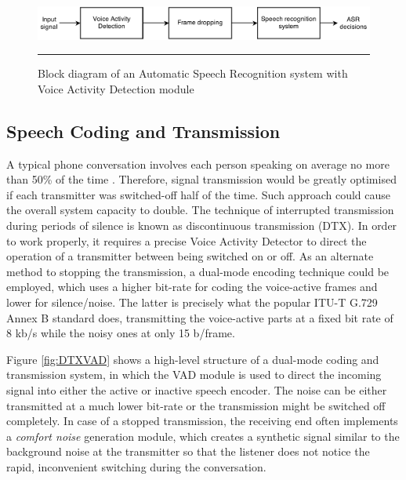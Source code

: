 \begin{figure}[htbp]
	\centering
		\includegraphics[width=1\columnwidth]{Figures/ASRVAD.png}
		\rule{37em}{0.5pt}
	\caption[Automatic Speech Recognition system with Voice Activity Detection module]{Block diagram of an Automatic Speech Recognition system with Voice Activity Detection module \cite{RamirezGorriz}}
	\label{fig:ASRVAD}
\end{figure}

\subsection{Speech Coding and Transmission}

A typical phone conversation involves each person speaking on average no more than 50\% of the time \citep{GSMControl}. Therefore, signal transmission would be greatly optimised if each transmitter was switched-off half of the time. Such approach could cause the overall system capacity to double. The technique of interrupted transmission during periods of silence is known as discontinuous transmission (DTX). In order to work properly, it requires a precise Voice Activity Detector to direct the operation of a transmitter between being switched on or off. As an alternate method to stopping the transmission, a dual-mode encoding technique could be employed, which uses a higher bit-rate for coding the voice-active frames and lower for silence/noise. The latter is precisely what the popular ITU-T G.729 Annex B \cite{G729} standard does, transmitting the voice-active parts at a fixed bit rate of 8 kb/s while the noisy ones at only 15 b/frame.

Figure \ref{fig:DTXVAD} shows a high-level structure of a dual-mode coding and transmission system, in which the VAD module is used to direct the incoming signal into either the active or inactive speech encoder. The noise can be either transmitted at a much lower bit-rate or the transmission might be switched off completely. In case of a stopped transmission, the receiving end often implements a \emph{comfort noise} \citep{GSMControl, G729, RamirezGorriz} generation module, which creates a synthetic signal similar to the background noise at the transmitter so that the listener does not notice the rapid, inconvenient switching during the conversation.

